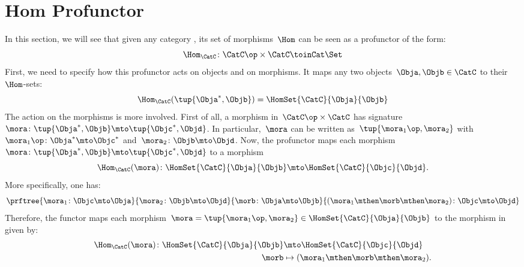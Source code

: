 \section{Hom Profunctor}
In this section, we will see that given any category \CatC, its set of morphisms~$\Hom$ can be seen as a profunctor of the form:
\begin{equation*}
    \Hom_\CatC\colon \CatC \op \times \CatC \toinCat \Set
\end{equation*}
First, we need to specify how this profunctor acts on objects and on morphisms.
It maps any two objects~$\Obja,\Objb\in \CatC$ to their~$\Hom$-sets:
\begin{equation*}
    \Hom_\CatC(\tup{\Obja^*,\Objb})=\HomSet{\CatC}{\Obja}{\Objb}
\end{equation*}
The action on the morphisms is more involved. First of all, a morphism in~$\CatC\op \times \CatC$ has signature~$\mora \colon \tup{\Obja^*,\Objb}\mto \tup{\Objc^*, \Objd}$.
In particular,~$\mora$ can be written as~$\tup{\mora_1\op,\mora_2}$ with~$\mora_1\op\colon \Obja^*\mto \Objc^*$ and~$\mora_2\colon \Objb\mto \Objd$.
Now, the profunctor maps each morphism~$\mora \colon \tup{\Obja^*,\Objb}\mto \tup{\Objc^*, \Objd}$ to a morphism
\begin{equation*}
\Hom_\CatC(\mora)\colon \HomSet{\CatC}{\Obja}{\Objb}\mto \HomSet{\CatC}{\Objc}{\Objd}.
\end{equation*}
More specifically, one has:
\begin{equation*}
    \prftree{\mora_1\colon \Objc \mto \Obja}{\mora_2\colon \Objb\mto \Objd}{\morb\colon \Obja\mto \Objb}{(\mora_1\mthen \morb \mthen \mora_2)\colon \Objc\mto \Objd}
\end{equation*}
Therefore, the functor maps each morphism~$\mora=\tup{\mora_1\op,\mora_2}\in \HomSet{\CatC}{\Obja}{\Objb}$ to the morphism in \Set given by:
\begin{equation*}
\begin{aligned}
    \Hom_\CatC(\mora)\colon \HomSet{\CatC}{\Obja}{\Objb}&\mto \HomSet{\CatC}{\Objc}{\Objd}\\
    \morb &\mapsto (\mora_1\mthen \morb \mthen \mora_2).
\end{aligned}
\end{equation*}

